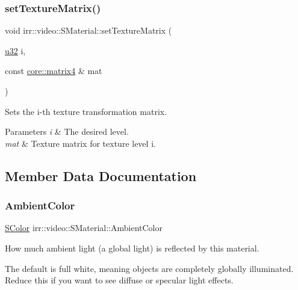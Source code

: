 \subsubsection{\texorpdfstring{set\+Texture\+Matrix()}{setTextureMatrix()}\hspace{0.1cm}{\footnotesize\ttfamily [2/2]}}
{\footnotesize\ttfamily void irr\+::video\+::\+S\+Material\+::set\+Texture\+Matrix (\begin{DoxyParamCaption}\item[{\hyperlink{namespaceirr_a0416a53257075833e7002efd0a18e804}{u32}}]{i,  }\item[{const \hyperlink{namespaceirr_1_1core_a4c9d4e29899535971052810954a14431}{core\+::matrix4} \&}]{mat }\end{DoxyParamCaption})\hspace{0.3cm}{\ttfamily [inline]}}



Sets the i-\/th texture transformation matrix. 


\begin{DoxyParams}{Parameters}
{\em i} & The desired level. \\
\hline
{\em mat} & Texture matrix for texture level i. \\
\hline
\end{DoxyParams}


\subsection{Member Data Documentation}
\mbox{\label{classirr_1_1video_1_1SMaterial_a434c189b7c618c66f4d09118d30e6b4b}} 
\subsubsection{\texorpdfstring{Ambient\+Color}{AmbientColor}}
{\footnotesize\ttfamily \hyperlink{classirr_1_1video_1_1SColor}{S\+Color} irr\+::video\+::\+S\+Material\+::\+Ambient\+Color}



How much ambient light (a global light) is reflected by this material. 

The default is full white, meaning objects are completely globally illuminated. Reduce this if you want to see diffuse or specular light effects. \mbox{\label{classirr_1_1video_1_1SMaterial_a8f42b43ebf214c502e6758b9b608c095}} 
